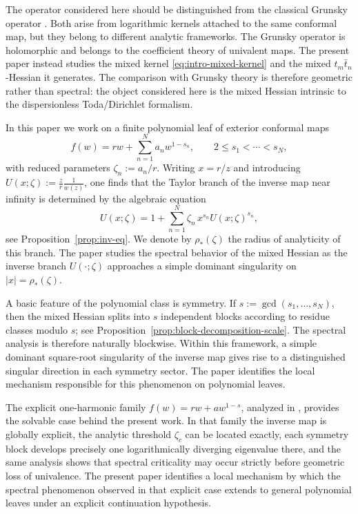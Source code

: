 \documentclass[11pt]{amsart}
\numberwithin{equation}{section}
\theoremstyle{plain}
\theoremstyle{definition}
\theoremstyle{remark}
\begin{document}
The operator considered here should be distinguished from the classical
Grunsky operator \cite{Schiffer1981,Shen2010,JohanssonViklund2023}. Both arise from logarithmic kernels attached to the
same conformal map, but they belong to different analytic frameworks.  The
Grunsky operator is holomorphic and belongs to the coefficient theory of
univalent maps.  The present paper instead studies the mixed kernel
\eqref{eq:intro-mixed-kernel} and the mixed \(t_m\bar t_n\)-Hessian it
generates.  The comparison with Grunsky theory is therefore geometric rather
than spectral: the object considered here is the mixed Hessian intrinsic to
the dispersionless Toda/Dirichlet formalism.

In this paper we work on a finite polynomial leaf of exterior conformal maps
\begin{equation}\label{eq:intro-map}
	f(w)=rw+\sum_{n=1}^{N} a_n w^{1-s_n},
	\qquad
	2\le s_1<\cdots<s_N,
\end{equation}
with reduced parameters \(\zeta_n:=a_n/r\).  Writing \(x=r/z\) and
introducing
\(U(x;\zeta):=\frac{z}{r}\frac{1}{w(z)}\), one finds that the Taylor branch of
the inverse map near infinity is determined by the algebraic equation
\begin{equation}\label{eq:intro-inv}
	U(x;\zeta)
	=
	1+\sum_{n=1}^{N}\zeta_n\,x^{s_n}U(x;\zeta)^{s_n},
\end{equation}
see Proposition~\ref{prop:inv-eq}. We denote by \(\rho_*(\zeta)\) the radius
of analyticity of this branch. The paper studies the spectral behavior of the
mixed Hessian as the inverse branch \(U(\cdot;\zeta)\) approaches a simple
dominant singularity on \(|x|=\rho_*(\zeta)\).

A basic feature of the polynomial class is symmetry. If
\(s:=\gcd(s_1,\dots,s_N)\), then the mixed Hessian splits into \(s\)
independent blocks according to residue classes modulo \(s\); see
Proposition~\ref{prop:block-decomposition-scale}. The spectral analysis is
therefore naturally blockwise. Within this framework, a simple dominant
square-root singularity of the inverse map gives rise to a distinguished
singular direction in each symmetry sector. The paper identifies the
local mechanism responsible for this phenomenon on polynomial leaves.

The explicit one-harmonic family \(f(w)=rw+aw^{1-s}\), analyzed in
\cite{Alekseev2025-1}, provides the solvable case behind the present work.
In that family the inverse map is globally explicit, the analytic threshold
\(\zeta_c\) can be located exactly, each symmetry block develops precisely one
logarithmically diverging eigenvalue there, and the same analysis shows that
spectral criticality may occur strictly before geometric loss of univalence.
The present paper identifies a local mechanism by which the spectral phenomenon observed in that explicit case extends to general polynomial leaves under an explicit continuation hypothesis.
\end{document}
